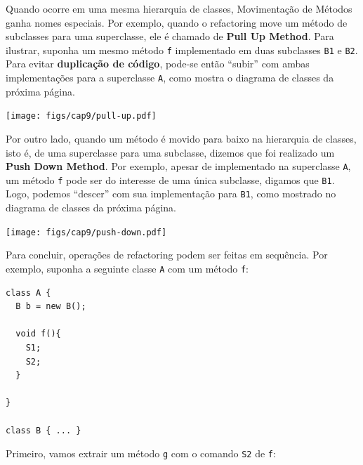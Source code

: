 \documentclass[
  11pt,
  twoside]{book}
\newcommand{\passthrough}[1]{#1}
\let\origfigure\figure
\let\endorigfigure\endfigure
\renewenvironment{figure}[1][2] {
    \expandafter\origfigure\expandafter[!h]
} {
    \endorigfigure
}
\begin{document}

Quando ocorre em uma mesma hierarquia de classes, Movimentação de
Métodos ganha nomes especiais. Por exemplo, quando o refactoring move um
método de subclasses para uma superclasse, ele é chamado de \textbf{Pull
Up Method}. Para ilustrar, suponha um mesmo método
\passthrough{\lstinline!f!} implementado em duas subclasses
\passthrough{\lstinline!B1!} e \passthrough{\lstinline!B2!}. Para evitar
\textbf{duplicação de código}, pode-se então ``subir'' com ambas
implementações para a superclasse \passthrough{\lstinline!A!}, como
mostra o diagrama de classes da próxima página.

\begin{figure}
\centering
\texttt{[image: figs/cap9/pull-up.pdf]}
\caption{Pull Up Method}
\end{figure}


Por outro lado, quando um método é movido para baixo na hierarquia de
classes, isto é, de uma superclasse para uma subclasse, dizemos que foi
realizado um \textbf{Push Down Method}. Por exemplo, apesar de
implementado na superclasse \passthrough{\lstinline!A!}, um método
\passthrough{\lstinline!f!} pode ser do interesse de uma única
subclasse, digamos que \passthrough{\lstinline!B1!}. Logo, podemos
``descer'' com sua implementação para \passthrough{\lstinline!B1!}, como
mostrado no diagrama de classes da próxima página.

\begin{figure}
\centering
\texttt{[image: figs/cap9/push-down.pdf]}
\caption{Push Down Method}
\end{figure}

Para concluir, operações de refactoring podem ser feitas em sequência.
Por exemplo, suponha a seguinte classe \passthrough{\lstinline!A!} com
um método \passthrough{\lstinline!f!}:

\newpage

\begin{lstlisting}
class A {
  B b = new B();

  void f(){
    S1;
    S2;
  }

}

class B { ... }
\end{lstlisting}

Primeiro, vamos extrair um método \passthrough{\lstinline!g!} com o
comando \passthrough{\lstinline!S2!} de \passthrough{\lstinline!f!}:
\end{document}
